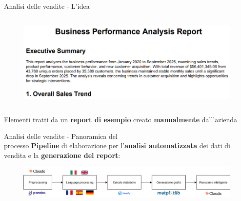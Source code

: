 \documentclass{beamer}
\begin{document}
\begin{frame}{Analisi delle vendite - L'idea}
\begin{columns}
\begin{column}{0.33\textwidth}
\begin{figure}
					\centering
					\includegraphics[width=\textwidth]{Esempio di report delle vendite - Resoconto.png}
				\end{figure}
			\end{column}
		\end{columns}

		\vspace{1em}
		Elementi tratti da un \textbf{report di esempio} creato \textbf{manualmente} dall'azienda
	\end{frame}

	\begin{frame}{Analisi delle vendite - Panoramica del\\ processo}
		\textbf{Pipeline} di elaborazione per l'\textbf{analisi automatizzata} dei dati di vendita e la \textbf{generazione del report}:

		\begin{figure}
			\centering
			\includegraphics[width=\textwidth]{Diagramma pipeline analisi delle vendite.png}
		\end{figure}
	\end{frame}
\end{document}
